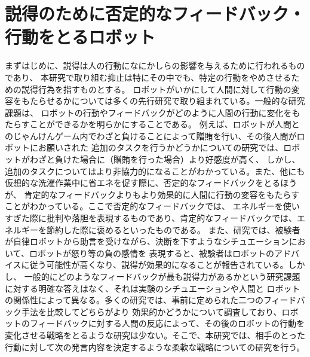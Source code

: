 \documentclass[11pt,a4j]{jreport}
\begin{document}
\section{説得のために否定的なフィードバック・行動をとるロボット}
まずはじめに、説得は人の行動になにかしらの影響を与えるために行われるものであり、
本研究で取り組む抑止は特にその中でも、特定の行動をやめさせるための説得行為を指すものとする。
ロボットがいかにして人間に対して行動の変容をもたらせるかについては多くの先行研究で取り組まれている。一般的な研究課題は、
ロボットの行動やフィードバックがどのように人間の行動に変化をもたらすことができるかを明らかにすることである。
例えば、ロボットが人間とのじゃんけんゲーム内でわざと負けることによって贈賄を行い、その後人間がロボットにお願いされた
追加のタスクを行うかどうかについての研究\cite{sandoval2016can}では、ロボットがわざと負けた場合に（贈賄を行った場合）より好感度が高く、
しかし、追加のタスクについてはより非協力的になることがわかっている。また、他にも仮想的な洗濯作業中に省エネを促す際に、否定的なフィードバックをとるほうが、
肯定的なフィードバックよりもより効果的に人間に行動の変容をもたらすことがわかっている\cite{Midden2009}。ここで否定的なフィードバックでは、
エネルギーを使いすぎた際に批判や落胆を表現するものであり、肯定的なフィードバックでは、エネルギーを節約した際に褒めるといったものである。
また、研究\cite{paradeda2019makes}では、被験者が自律ロボットから助言を受けながら、決断を下すようなシチュエーションにおいて、ロボットが怒り等の負の感情を
表現すると、被験者はロボットのアドバイスに従う可能性が高くなり、説得が効果的になることが報告されている。しかし、
一般的にどのようなフィードバックが最も説得力があるかという研究課題に対する明確な答えはなく、それは実験のシチュエーションや人間と
ロボットの関係性によって異なる。多くの研究では、事前に定められた二つのフィードバック手法を比較してどちらがより
効果的かどうかについて調査しており、ロボットのフィードバックに対する人間の反応によって、その後のロボットの行動を
変化させる戦略をとるような研究は少ない。そこで、本研究では、相手のとった行動に対して次の発言内容を決定するような柔軟な戦略についての研究を行う。
\end{document}
